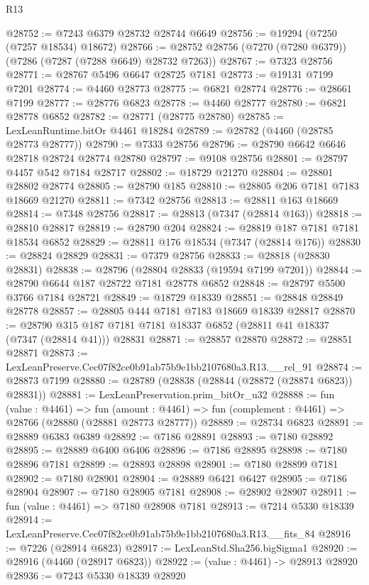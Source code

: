 \begin{lexlean}{R13}
\begin{coremodule}
@28752 := @7243 @6379 @28732 @28744 @6649
@28756 := @19294 (@7250 (@7257 @18534) @18672)
@28766 := @28752 @28756 (@7270 (@7280 @6379)) (@7286 (@7287 (@7288 @6649) @28732 @7263))
@28767 := @7323 @28756
@28771 := @28767 @5496 @6647 @28725 @7181
@28773 := @19131 @7199 @7201
@28774 := @4460 @28773
@28775 := @6821 @28774
@28776 := @28661 @7199
@28777 := @28776 @6823
@28778 := @4460 @28777
@28780 := @6821 @28778 @6852
@28782 := @28771 (@28775 @28780)
@28785 := LexLeanRuntime.bitOr @4461 @18284
@28789 := @28782 (@4460 (@28785 @28773 @28777))
@28790 := @7333 @28756
@28796 := @28790 @6642 @6646 @28718 @28724 @28774 @28780
@28797 := @9108 @28756
@28801 := @28797 @4457 @542 @7184 @28717
@28802 := @18729 @21270
@28804 := @28801 @28802 @28774
@28805 := @28790 @185
@28810 := @28805 @206 @7181 @7183 @18669 @21270
@28811 := @7342 @28756
@28813 := @28811 @163 @18669
@28814 := @7348 @28756
@28817 := @28813 (@7347 (@28814 @163))
@28818 := @28810 @28817
@28819 := @28790 @204
@28824 := @28819 @187 @7181 @7181 @18534 @6852
@28829 := @28811 @176 @18534 (@7347 (@28814 @176))
@28830 := @28824 @28829
@28831 := @7379 @28756
@28833 := @28818 (@28830 @28831)
@28838 := @28796 (@28804 @28833 (@19594 @7199 @7201))
@28844 := @28790 @6644 @187 @28722 @7181 @28778 @6852
@28848 := @28797 @5500 @3766 @7184 @28721
@28849 := @18729 @18339
@28851 := @28848 @28849 @28778
@28857 := @28805 @444 @7181 @7183 @18669 @18339 @28817
@28870 := @28790 @315 @187 @7181 @7181 @18337 @6852 (@28811 @41 @18337 (@7347 (@28814 @41))) @28831
@28871 := @28857 @28870
@28872 := @28851 @28871
@28873 := LexLeanPreserve.Cec07f82ce0b91ab75b9e1bb2107680a3.R13.__rel_91
@28874 := @28873 @7199
@28880 := @28789 (@28838 (@28844 (@28872 (@28874 @6823)) @28831))
@28881 := LexLeanPreservation.prim_bitOr_u32
@28888 := fun (value : @4461) =>
  fun (amount : @4461) => fun (complement : @4461) => @28766 (@28880 (@28881 @28773 @28777))
@28889 := @28734 @6823
@28891 := @28889 @6383 @6389
@28892 := @7186 @28891
@28893 := @7180 @28892
@28895 := @28889 @6400 @6406
@28896 := @7186 @28895
@28898 := @7180 @28896 @7181
@28899 := @28893 @28898
@28901 := @7180 @28899 @7181
@28902 := @7180 @28901
@28904 := @28889 @6421 @6427
@28905 := @7186 @28904
@28907 := @7180 @28905 @7181
@28908 := @28902 @28907
@28911 := fun (value : @4461) => @7180 @28908 @7181
@28913 := @7214 @5330 @18339
@28914 := LexLeanPreserve.Cec07f82ce0b91ab75b9e1bb2107680a3.R13.__fits_84
@28916 := @7226 (@28914 @6823)
@28917 := LexLeanStd.Sha256.bigSigma1
@28920 := @28916 (@4460 (@28917 @6823))
@28922 := (value : @4461) -> @28913 @28920
@28936 := @7243
    @5330
    @18339
    @28920

\end{coremodule}
\end{lexlean}
